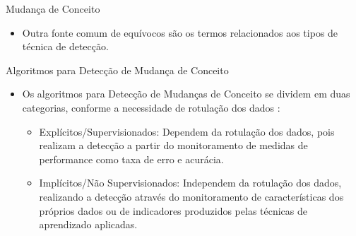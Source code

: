 \documentclass[10pt]{beamer}
\begin{document}
\begin{frame}{Mudança de Conceito}
    \begin{itemize}
        \item<1 -> Outra fonte comum de equívocos são os termos relacionados aos tipos de técnica de detecção.
    \end{itemize}

    \begin{table}[!ht]
        \centering
    \caption{Tipos de Técnicas de Detecção}
    \label{tbl:taxonomy_types_of_detection}
    \end{table}
\end{frame}

\begin{frame}{Algoritmos para Detecção de Mudança de Conceito}
    \begin{itemize}
        \item<1 -> Os algoritmos para Detecção de Mudanças de Conceito se dividem em duas categorias, conforme a necessidade de rotulação dos dados \cite{Zliobaite:2010}:
        \begin{itemize}
        \item<2 -> \alert{Explícitos/Supervisionados}: Dependem da rotulação dos dados, pois realizam a detecção a partir do monitoramento de medidas de performance como taxa de erro e acurácia.
        \item<3 -> \alert{Implícitos/Não Supervisionados}: Independem da rotulação dos dados, realizando a detecção através do monitoramento de características dos próprios dados ou de indicadores produzidos pelas técnicas de aprendizado aplicadas.
        \end{itemize}
    \end{itemize}
\end{frame}
\end{document}
